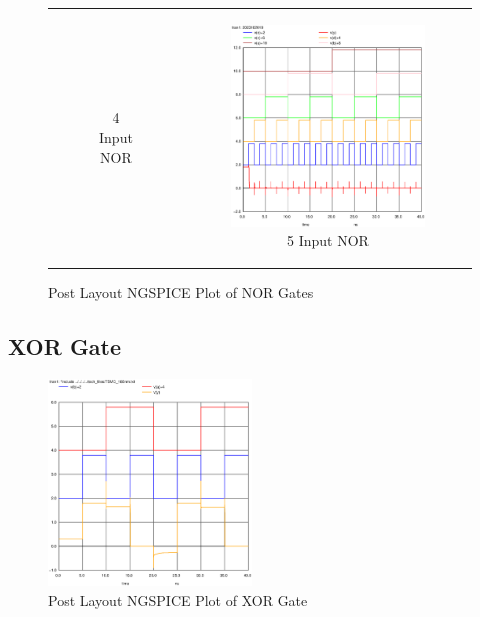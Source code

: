 \documentclass[conference]{IEEEtran}
\begin{document}
\begin{figure}[H]
\begin{tabular}{cc}
\begin{subfigure}{0.44\linewidth}
            \caption{4 Input NOR}
        \end{subfigure} &
        \begin{subfigure}{0.44\linewidth}
            \centering
            \includegraphics[width=\textwidth]{images/nor_5_cmos_post_tran.eps}
            \caption{5 Input NOR}
        \end{subfigure}
    \end{tabular}
    \caption{Post Layout NGSPICE Plot of NOR Gates}
\end{figure}

\subsection{XOR Gate}

\begin{figure}[H]
    \centering
    \includegraphics[width=0.48\textwidth]{images/xor_optimized_post_tran.eps}
    \caption{Post Layout NGSPICE Plot of XOR Gate}
\end{figure}
\end{document}
